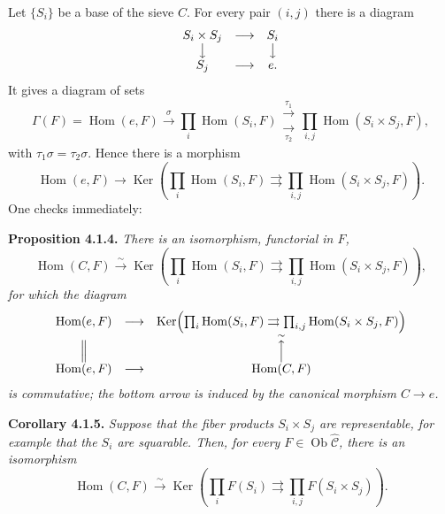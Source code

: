 Let \(\{S_i\}\) be a base of the sieve \(C\). For every pair \((i,j)\) there
is a diagram
\[
\begin{array}{ccc}
 S_i\times S_j&\longrightarrow&S_i\\
 \big\downarrow&&\big\downarrow\\
 S_j&\longrightarrow&e.
\end{array}
\]
It gives a diagram of sets
\[
 \Gamma(F)=\operatorname{Hom}(e,F)
 \xrightarrow{\sigma}
 \prod_i\operatorname{Hom}(S_i,F)
 \mathrel{\substack{\xrightarrow{\tau_1}\\[-0.5ex]
                     \xrightarrow[\tau_2]{}}}
 \prod_{i,j}\operatorname{Hom}(S_i\times S_j,F),
\]
with \(\tau_1\sigma=\tau_2\sigma\). Hence there is a morphism
\[
 \operatorname{Hom}(e,F)\longrightarrow
 \operatorname{Ker}\!\left(
 \prod_i\operatorname{Hom}(S_i,F)
 \rightrightarrows
 \prod_{i,j}\operatorname{Hom}(S_i\times S_j,F)
 \right).
\]
One checks immediately:

\medskip
\noindent{}\textbf{Proposition 4.1.4.}
\textit{There is an isomorphism, functorial in \(F\),}
\[
 \operatorname{Hom}(C,F)\xrightarrow{\sim}
 \operatorname{Ker}\!\left(
 \prod_i\operatorname{Hom}(S_i,F)
 \rightrightarrows
 \prod_{i,j}\operatorname{Hom}(S_i\times S_j,F)
 \right),
\]
\textit{for which the diagram}
\[
\begin{array}{ccc}
 \operatorname{Hom}(e,F)&\longrightarrow&
 \operatorname{Ker}\!\left(
 \prod_i\operatorname{Hom}(S_i,F)\rightrightarrows
 \prod_{i,j}\operatorname{Hom}(S_i\times S_j,F)\right)\\
 \Big\Vert&&\overset{\sim}{\Big\uparrow}\\
 \operatorname{Hom}(e,F)&\longrightarrow&\operatorname{Hom}(C,F)
\end{array}
\]
\textit{is commutative; the bottom arrow is induced by the canonical
morphism \(C\to e\).}

\medskip
\noindent{}\textbf{Corollary 4.1.5.}
\textit{Suppose that the fiber products \(S_i\times S_j\) are representable,
for example that the \(S_i\) are squarable. Then, for every
\(F\in\operatorname{Ob}\widehat{\mathscr C}\), there is an isomorphism}
\[
 \operatorname{Hom}(C,F)\xrightarrow{\sim}
 \operatorname{Ker}\!\left(
 \prod_iF(S_i)\rightrightarrows
 \prod_{i,j}F(S_i\times S_j)\right).
\]

